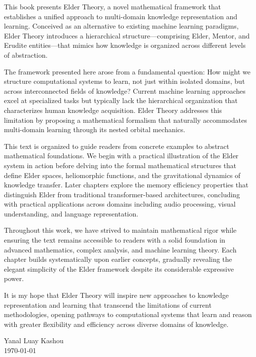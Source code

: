 \documentclass[11pt,twoside]{book}
\begin{document}
This book presents Elder Theory, a novel mathematical framework that establishes a unified approach to multi-domain knowledge representation and learning. Conceived as an alternative to existing machine learning paradigms, Elder Theory introduces a hierarchical structure—comprising Elder, Mentor, and Erudite entities—that mimics how knowledge is organized across different levels of abstraction.

The framework presented here arose from a fundamental question: How might we structure computational systems to learn, not just within isolated domains, but across interconnected fields of knowledge? Current machine learning approaches excel at specialized tasks but typically lack the hierarchical organization that characterizes human knowledge acquisition. Elder Theory addresses this limitation by proposing a mathematical formalism that naturally accommodates multi-domain learning through its nested orbital mechanics.

This text is organized to guide readers from concrete examples to abstract mathematical foundations. We begin with a practical illustration of the Elder system in action before delving into the formal mathematical structures that define Elder spaces, heliomorphic functions, and the gravitational dynamics of knowledge transfer. Later chapters explore the memory efficiency properties that distinguish Elder from traditional transformer-based architectures, concluding with practical applications across domains including audio processing, visual understanding, and language representation.

Throughout this work, we have strived to maintain mathematical rigor while ensuring the text remains accessible to readers with a solid foundation in advanced mathematics, complex analysis, and machine learning theory. Each chapter builds systematically upon earlier concepts, gradually revealing the elegant simplicity of the Elder framework despite its considerable expressive power.

It is my hope that Elder Theory will inspire new approaches to knowledge representation and learning that transcend the limitations of current methodologies, opening pathways to computational systems that learn and reason with greater flexibility and efficiency across diverse domains of knowledge.

\vspace{1cm}
\begin{flushright}
Yanal Luay Kashou\\
\today
\end{flushright}
\end{document}
